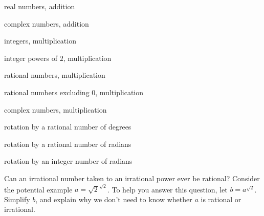\documentclass[../gatm_answers.tex]{subfiles}
\begin{document}
\begin{inner_problem}
\item real numbers, addition
\end{inner_problem}

\begin{inner_problem}
\item complex numbers, addition
\end{inner_problem}

\begin{inner_problem}
\item integers, multiplication
\end{inner_problem}

\begin{inner_problem}
\item integer powers of $2$, multiplication
\end{inner_problem}

\begin{inner_problem}
\item rational numbers, multiplication
\end{inner_problem}

\begin{inner_problem}
\item rational numbers excluding $0$, multiplication
\end{inner_problem}

\begin{inner_problem}
\item complex numbers, multiplication
\end{inner_problem}

\begin{inner_problem}
\item rotation by a rational number of degrees
\end{inner_problem}

\begin{inner_problem}
\item rotation by a rational number of radians
\end{inner_problem}

\begin{inner_problem}
\item rotation by an integer number of radians
\end{inner_problem}

\begin{outer_problem}
\item Can an irrational number taken to an irrational power ever be rational? Consider the potential example $a = \sqrt{2}^{\sqrt{2}}$. To help you answer this question, let $b = a^{\sqrt{2}}$. Simplify $b$, and explain why we don’t need to know whether $a$ is rational or irrational.
\end{outer_problem}
\end{document}
